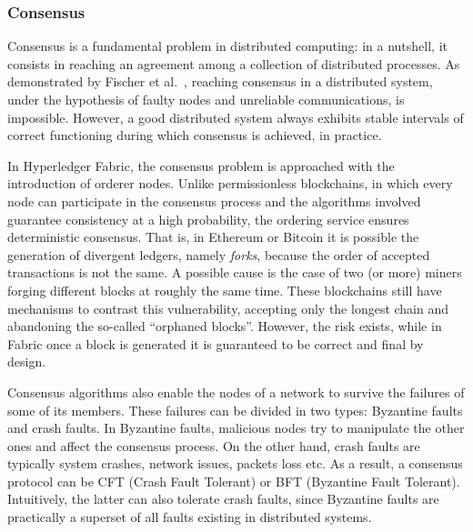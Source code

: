 \subsubsection{Consensus}
Consensus is a fundamental problem in distributed computing: in a nutshell, it consists in reaching an agreement among a collection of distributed processes.
As demonstrated by Fischer et al.~\cite{consensus_impossible}, reaching consensus in a distributed system, under the hypothesis of faulty nodes and unreliable communications, is impossible. However, a good distributed system always exhibits stable intervals of correct functioning during which consensus is achieved, in practice.

In Hyperledger Fabric, the consensus problem is approached with the introduction of orderer nodes. Unlike permissionless blockchains, in which every node can participate in the consensus process and the algorithms involved guarantee consistency at a high probability, the ordering service ensures deterministic consensus. That is, in Ethereum or Bitcoin it is possible the generation of divergent ledgers, namely \emph{forks}, because the order of accepted transactions is not the same. A possible cause is the case of two (or more) miners forging different blocks at roughly the same time. These blockchains still have mechanisms to contrast this vulnerability, accepting only the longest chain and abandoning the so-called ``orphaned blocks''. However, the risk exists, while in Fabric once a block is generated it is guaranteed to be correct and final by design.

Consensus algorithms also enable the nodes of a network to survive the failures of some of its members. These failures can be divided in two types: Byzantine faults and crash faults. In Byzantine faults, malicious nodes try to manipulate the other ones and affect the consensus process. On the other hand, crash faults are typically system crashes, network issues, packets loss etc. As a result, a consensus protocol can be CFT (Crash Fault Tolerant) or BFT (Byzantine Fault Tolerant). Intuitively, the latter can also tolerate crash faults, since Byzantine faults are practically a superset of all faults existing in distributed systems.

